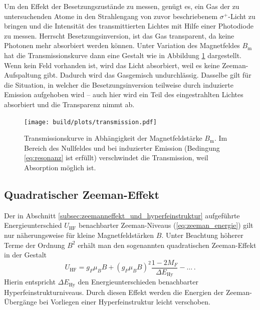 Um den Effekt der Besetzungszustände zu messen, genügt es, ein Gas der zu
untersuchenden Atome in den Strahlengang von zuvor beschriebenem
$\sigma^+$-Licht zu bringen und die Intensität des transmittierten Lichtes mit
Hilfe einer Photodiode zu messen. Herrscht Besetzungsinversion, ist das Gas
transparent, da keine Photonen mehr absorbiert werden können. Unter Variation
des Magnetfeldes $B_\text{m}$ hat die Transmissionskurve dann eine Gestalt wie
in Abbildung \ref{fig:transmission} dargestellt.
Wenn kein Feld vorhanden ist, wird das Licht absorbiert, weil es keine
Zeeman-Aufspaltung gibt. Dadurch wird das Gasgemisch undurchlässig.
Dasselbe gilt für die Situation, in welcher die Besetzungsinversion teilweise
durch induzierte Emission aufgehoben wird -- auch hier wird ein Teil des
eingestrahlten Lichtes absorbiert und die Transparenz nimmt ab.
\begin{figure}
    \centering
    \texttt{[image: build/plots/transmission.pdf]}
    \caption{
        Transmissionskurve in Abhängigkeit der Magnetfeldstärke $B_\text{m}$.
        Im Bereich des Nullfeldes und bei induzierter Emission (Bedingung
        \ref{eq:resonanz} ist erfüllt) verschwindet die Transmission, weil
        Absorption möglich ist.
    }
    \label{fig:transmission}
\end{figure}

\subsection{Quadratischer Zeeman-Effekt}
\label{subsec:quadratischer_zeeman-effekt}
Der in Abschnitt \ref{subsec:zeemanneffekt_und_hyperfeinstruktur}
aufgeführte Energieunterschied $U_\text{HF}$ benachbarter Zeeman-Niveaus
(\ref{eq:zeeman_energie}) gilt nur näherungsweise für kleine Magnetfeldstärken
$B$. Unter Beachtung höherer Terme der Ordnung $B^2$ erhält man den sogenannten
quadratischen Zeeman-Effekt in der Gestalt
\begin{equation}
\label{eq:quadratischer_zeeman}
    U_\text{HF} = g_F \mu_B B
        + (g_F\mu_B B)^2 \frac{1 - 2M_F}{\Delta E_\text{Hy}} - \dots\,.
\end{equation}
Hierin entspricht $\Delta E_\text{Hy}$ den Energieunterschieden benachbarter
Hyperfeinstrukturniveaus. Durch diesen Effekt werden die Energien der
Zeeman-Übergänge bei Vorliegen einer Hyperfeinstruktur leicht verschoben.
